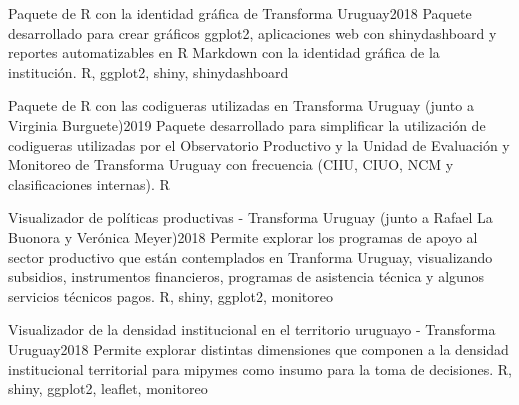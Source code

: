 %
%
%


\begin{projects}
	\project
	{Paquete de R con la identidad gráfica de Transforma Uruguay}{2018}
	{}
	{Paquete desarrollado para crear gráficos ggplot2, aplicaciones web con shinydashboard y reportes automatizables en R Markdown con la identidad gráfica de la institución.}
	{R, ggplot2, shiny, shinydashboard}
	
	\project
	{Paquete de R con las codigueras utilizadas en Transforma Uruguay (junto a Virginia Burguete)}{2019}
	{}
	{Paquete desarrollado para simplificar la utilización de codigueras utilizadas por el Observatorio Productivo y la Unidad de Evaluación y Monitoreo de Transforma Uruguay con frecuencia (CIIU, CIUO, NCM y clasificaciones internas).}
	{R}	
	
	\project
	{Visualizador de políticas productivas - Transforma Uruguay (junto a Rafael La Buonora y Verónica Meyer)}{2018}
	{}
	{Permite explorar los programas de apoyo al sector productivo que están contemplados en Tranforma Uruguay, visualizando subsidios, instrumentos financieros, programas de asistencia técnica y algunos servicios técnicos pagos.}
	{R, shiny, ggplot2, monitoreo}
	
	\project
	{Visualizador de la densidad institucional en el territorio uruguayo - Transforma Uruguay}{2018}
	{}
	{Permite explorar distintas dimensiones que componen a la densidad institucional territorial para mipymes como insumo para la toma de decisiones.}
	{R, shiny, ggplot2, leaflet, monitoreo}
\end{projects}